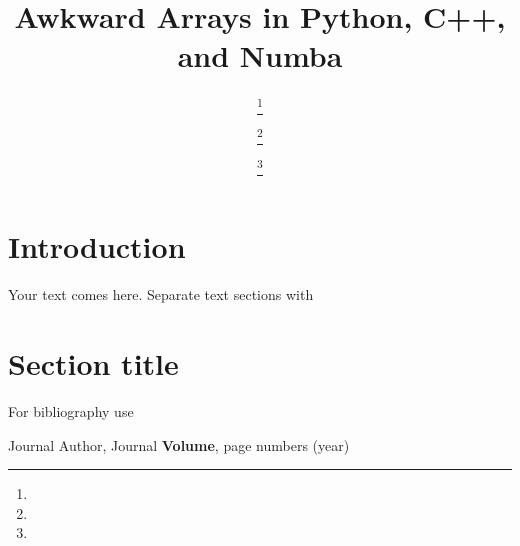 \documentclass{webofc}
\begin{document}
\title{Awkward Arrays in Python, C++, and Numba}

\author{%
 \fnsep\thanks{} \and
{} \fnsep\thanks{} \and
{} \fnsep\thanks{}}



\maketitle

\section{Introduction}
\label{intro}
Your text comes here. Separate text sections with

\section{Section title}
\label{sec-1}
For bibliography use \cite{RefJ}

% 
%
\begin{thebibliography}{}
Journal Author, Journal \textbf{Volume}, page numbers (year)
\end{thebibliography}
\end{document}
